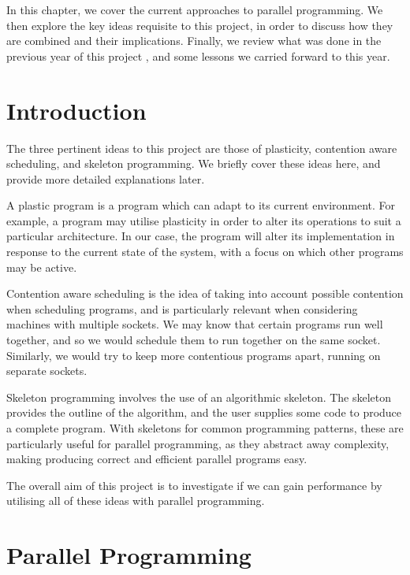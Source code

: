 
In this chapter, we cover the current approaches to parallel programming. We then explore the key ideas requisite to this project, in order to discuss how they are combined and their implications. Finally, we review what was done in the previous year of this project \cite{me}, and some lessons we carried forward to this year.

\section{Introduction}
\label{section:background:introduction}

The three pertinent ideas to this project are those of plasticity, contention aware scheduling, and skeleton programming. We briefly cover these ideas here, and provide more detailed explanations later.

A plastic program is a program which can adapt to its current environment. For example, a program may utilise plasticity in order to alter its operations to suit a particular architecture. In our case, the program will alter its implementation in response to the current state of the system, with a focus on which other programs may be active.

Contention aware scheduling is the idea of taking into account possible contention when scheduling programs, and is particularly relevant when considering machines with multiple sockets. We may know that certain programs run well together, and so we would schedule them to run together on the same socket. Similarly, we would try to keep more contentious programs apart, running on separate sockets.

Skeleton programming involves the use of an algorithmic skeleton. The skeleton provides the outline of the algorithm, and the user supplies some code to produce a complete program. With skeletons for common programming patterns, these are particularly useful for parallel programming, as they abstract away complexity, making producing correct and efficient parallel programs easy.

The overall aim of this project is to investigate if we can gain performance by utilising all of these ideas with parallel programming. 



\section{Parallel Programming}
\label{section:background:parallel_programming}

